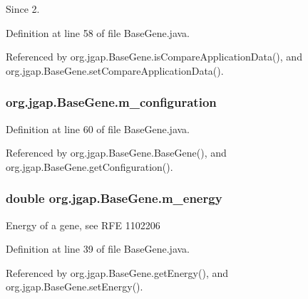 \begin{DoxySince}{Since}
2. 
\end{DoxySince}


Definition at line 58 of file Base\-Gene.\-java.



Referenced by org.\-jgap.\-Base\-Gene.\-is\-Compare\-Application\-Data(), and org.\-jgap.\-Base\-Gene.\-set\-Compare\-Application\-Data().

\hypertarget{classorg_1_1jgap_1_1_base_gene_a4d41d885b45ce031c33c88214f98019e}{
\subsubsection[{m\-\_\-configuration}]{ org.\-jgap.\-Base\-Gene.\-m\-\_\-configuration\hspace{0.3cm}{\ttfamily [private]}}}\label{classorg_1_1jgap_1_1_base_gene_a4d41d885b45ce031c33c88214f98019e}


Definition at line 60 of file Base\-Gene.\-java.



Referenced by org.\-jgap.\-Base\-Gene.\-Base\-Gene(), and org.\-jgap.\-Base\-Gene.\-get\-Configuration().

\hypertarget{classorg_1_1jgap_1_1_base_gene_a8553da900cf30fc4b0f5463404b86a8e}{
\subsubsection[{m\-\_\-energy}]{\setlength{\rightskip}{0pt plus 5cm}double org.\-jgap.\-Base\-Gene.\-m\-\_\-energy\hspace{0.3cm}{\ttfamily [private]}}}\label{classorg_1_1jgap_1_1_base_gene_a8553da900cf30fc4b0f5463404b86a8e}
Energy of a gene, see R\-F\-E 1102206 

Definition at line 39 of file Base\-Gene.\-java.



Referenced by org.\-jgap.\-Base\-Gene.\-get\-Energy(), and org.\-jgap.\-Base\-Gene.\-set\-Energy().

